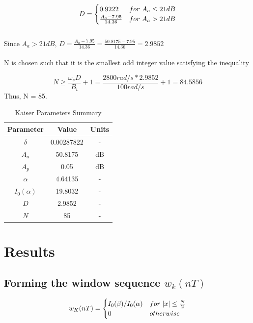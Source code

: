 \documentclass[11pt]{article}
\begin{document}
\[
    D = \begin{cases}
    0.9222 & for \hspace*{3pt} A_a \leq 21 dB \\
    \frac{A_a - 7.95}{14.36} & for \hspace*{3pt} A_a > 21 dB
   \end{cases}
   \]\\
{\color{ultramarine} Since $A_a > 21 dB$, $D =  \frac{A_a - 7.95}{14.36}= \frac{50.8175 - 7.95}{14.36} =    2.9852$}
\\
\\
N is chosen such that it is the smallest odd integer value satisfying the inequality 

{\color{ultramarine} $$N\geq\frac{\omega_sD}{B_t}+1 = \frac{2800 rad/s * 2.9852}{100 rad/s}+1  = 84.5856$$}
Thus, N = 85.

\begin{center}
    \begin{table}[h]
    \centering
    \caption {Kaiser Parameters Summary}
    \begin{tabular}{@{}ccc@{}}
        \toprule
            {Parameter}  & {Value} & {Units}  \\
            \midrule
            $\delta$           & 0.00287822 & -  \\
            $A_a$              & 50.8175    & dB \\
            $A_p$              & 0.05       & dB \\
            $\alpha$           & 4.64135    & -  \\
            $I_0(\alpha)$      & 19.8032    & -  \\
            $D$                & 2.9852     & -  \\
            $N$                & 85         & -  \\
        \bottomrule
    \end{tabular}
    \end{table}
    \end{center}


\section{Results}
\subsection{Forming the window sequence $w_k(nT)$}


\[
	w_K(nT) = \begin{cases}
	I_0(\beta)/I_0(\alpha) & for \hspace*{3pt} \abs{x}  \leq \frac{N}{2}  \\
	0 & otherwise 
	\end{cases}
\]
\end{document}
